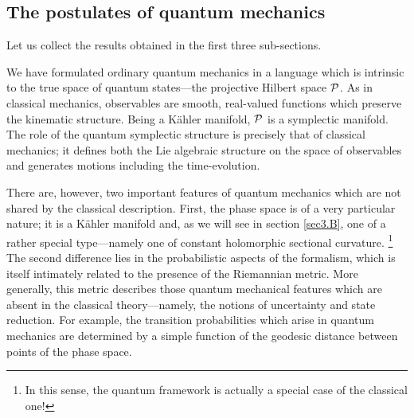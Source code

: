 \subsection{The postulates of quantum mechanics} \label{sec2.D}

Let us collect the results obtained in the first three sub-sections.

We have formulated ordinary quantum mechanics in a language which is
intrinsic to the true space of quantum states---the projective Hilbert
space $\P$.  As in classical mechanics, observables are smooth,
real-valued functions which preserve the kinematic structure.  Being a
K\"ahler manifold, $\P$ is a symplectic manifold.  The role of the
quantum symplectic structure is precisely that of classical mechanics;
it defines both the Lie algebraic structure on the space of
observables and generates motions including the time-evolution.

There are, however, two important features of quantum mechanics which
are not shared by the classical description.  First, the phase space
is of a very particular nature; it is a K\"ahler manifold and, as we
will see in section \ref{sec3.B}, one of a rather special
type---namely one of constant holomorphic sectional curvature.%
%
\footnote{In this sense, the quantum framework is actually a special 
case of the classical one!}
%
The second difference lies in the probabilistic aspects of the
formalism, which is itself intimately related to the presence of the
Riemannian metric. More generally, this metric describes those quantum
mechanical features which are absent in the classical theory---namely,
the notions of uncertainty and state reduction.  For example, the
transition probabilities which arise in quantum mechanics are
determined by a simple function of the geodesic distance between
points of the phase space.

